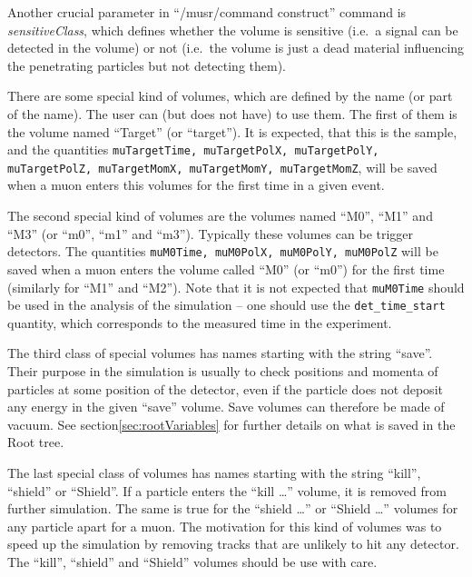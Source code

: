 \documentclass[twoside]{dis04}
\begin{document}
Another crucial parameter in ``/musr/command construct'' command 
is \emph{sensitiveClass}, which defines whether the volume
is sensitive (i.e.\ a signal can be detected in the volume) or not (i.e.\ the volume
is just a dead material influencing the penetrating particles but not detecting them).
 
There are some special kind of volumes, which are defined by the name (or part of the name).
The user can (but does not have) to use them.
The first of them is the volume named ``Target'' (or ``target'').  It is expected, that
this is the sample, and the quantities {\tt muTargetTime, muTargetPolX, muTargetPolY, muTargetPolZ,
muTargetMomX, muTargetMomY, muTargetMomZ},
will be saved when a muon enters this volumes for the first time in a given event. 

The second special kind of volumes are the volumes named ``M0'', ``M1'' and ``M3'' (or ``m0'',
``m1'' and ``m3'').  Typically these volumes can be trigger detectors. 
The quantities  {\tt muM0Time, muM0PolX, muM0PolY, muM0PolZ} 
will be saved when a muon enters the volume called ``M0'' (or ``m0'')  for the first time
(similarly for ``M1'' and ``M2'').
Note that it is not expected that {\tt muM0Time} should be used in the analysis of the
simulation -- one should use the {\tt det\_time\_start} quantity, which corresponds
to the measured time in the experiment.

The third class of special volumes has names starting with the string ``save''.
Their purpose in the simulation is usually to check positions
and momenta of particles at some position of the detector, even if the particle does not deposit any energy in
the given ``save'' volume.  Save volumes can therefore be made of vacuum.
See section\ref{sec:rootVariables} for further details on what is saved in the Root tree.

The last special class of volumes has names starting with the string ``kill'',
``shield'' or ``Shield''.
If a particle enters the ``kill \ldots'' volume, it is removed from further simulation.
The same is true for the ``shield \ldots'' or ``Shield \ldots'' volumes for
any particle apart for a muon.
The motivation for this kind of volumes was to speed up the simulation by removing tracks
that are unlikely to hit any detector. The ``kill'', ``shield'' and ``Shield'' volumes should be use with
care.
\end{document}
